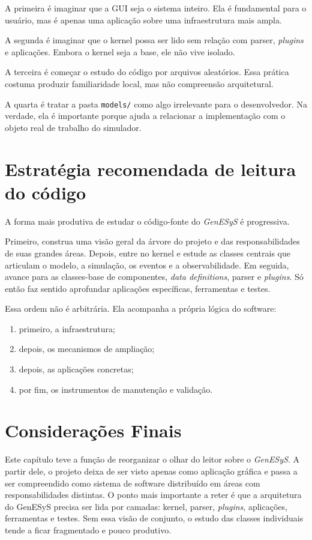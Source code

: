 A primeira é imaginar que a GUI seja o sistema inteiro. Ela é fundamental para o usuário, mas é apenas uma aplicação sobre uma infraestrutura mais ampla.

A segunda é imaginar que o kernel possa ser lido sem relação com parser, \textit{plugins} e aplicações. Embora o kernel seja a base, ele não vive isolado.

A terceira é começar o estudo do código por arquivos aleatórios. Essa prática costuma produzir familiaridade local, mas não compreensão arquitetural.

A quarta é tratar a pasta \texttt{models/} como algo irrelevante para o desenvolvedor. Na verdade, ela é importante porque ajuda a relacionar a implementação com o objeto real de trabalho do simulador.

\section{Estratégia recomendada de leitura do código}
\label{sec:cap6_estrategia_recomendada_leitura}

A forma mais produtiva de estudar o código-fonte do \textit{GenESyS} é progressiva.

Primeiro, construa uma visão geral da árvore do projeto e das responsabilidades de suas grandes áreas. Depois, entre no kernel e estude as classes centrais que articulam o modelo, a simulação, os eventos e a observabilidade. Em seguida, avance para as classes-base de componentes, \textit{data definitions}, parser e \textit{plugins}. Só então faz sentido aprofundar aplicações específicas, ferramentas e testes.

Essa ordem não é arbitrária. Ela acompanha a própria lógica do software:
\begin{enumerate}
    \item primeiro, a infraestrutura;
    \item depois, os mecanismos de ampliação;
    \item depois, as aplicações concretas;
    \item por fim, os instrumentos de manutenção e validação.
\end{enumerate}

\section{Considerações Finais}
\label{sec:cap6_consideracoes_finais}

Este capítulo teve a função de reorganizar o olhar do leitor sobre o \textit{GenESyS}. A partir dele, o projeto deixa de ser visto apenas como aplicação gráfica e passa a ser compreendido como sistema de software distribuído em áreas com responsabilidades distintas. O ponto mais importante a reter é que a arquitetura do GenESyS precisa ser lida por camadas: kernel, parser, \textit{plugins}, aplicações, ferramentas e testes. Sem essa visão de conjunto, o estudo das classes individuais tende a ficar fragmentado e pouco produtivo.

